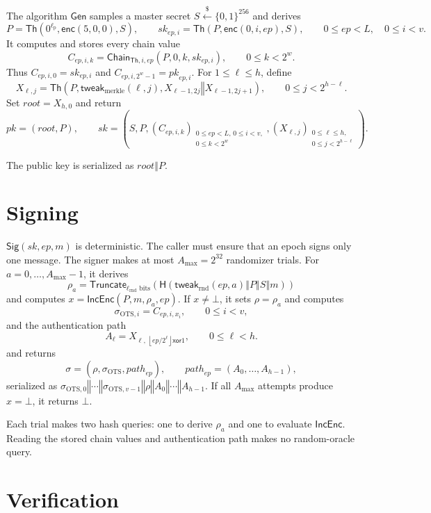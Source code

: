 \documentclass[11pt]{article}
\theoremstyle{definition}
\theoremstyle{plain}
\theoremstyle{remark}
\newcommand{\bits}[1]{\{0,1\}^{#1}}
\newcommand{\getsr}{\stackrel{\$}{\gets}}
\newcommand{\Th}{\mathsf{Th}}
\newcommand{\IncEnc}{\mathsf{IncEnc}}
\newcommand{\Gen}{\mathsf{Gen}}
\newcommand{\Sig}{\mathsf{Sig}}
\newcommand{\Chain}{\mathsf{Chain}}
\newcommand{\hash}{\mathsf{H}}
\newcommand{\Truncate}{\mathsf{Truncate}}
\newcommand{\concat}{\mathbin\Vert}
\newcommand{\ep}{\mathit{ep}}
\newcommand{\sk}{\mathit{sk}}
\newcommand{\pk}{\mathit{pk}}
\newcommand{\rootnode}{\mathit{root}}
\newcommand{\lpar}{\ell_{\mathrm{p}}}
\newcommand{\lrnd}{\ell_{\mathrm{rnd}}}
\newcommand{\amax}{A_{\max}}
\begin{document}
The algorithm $\Gen$ samples a master secret $S\getsr\bits{256}$ and derives
\[
  P=\Th\!\left(0^{\lpar},\mathsf{enc}(5,0,0),S\right),
  \qquad
  \mathit{sk}_{\ep,i}=\Th\!\left(P,\mathsf{enc}(0,i,\ep),S\right),
  \qquad 0\leq\ep<L,\quad 0\leq i<v.
\]
It computes and stores every chain value
\[
  C_{\ep,i,k}=\Chain_{\Th,i,\ep}(P,0,k,\mathit{sk}_{\ep,i}),
  \qquad 0\leq k<2^w.
\]
Thus $C_{\ep,i,0}=\mathit{sk}_{\ep,i}$ and $C_{\ep,i,2^w-1}=\mathit{pk}_{\ep,i}$. For $1\leq\ell\leq h$, define
\[
  X_{\ell,j}=\Th\!\left(P,\mathsf{tweak}_{\mathrm{merkle}}(\ell,j),X_{\ell-1,2j}\concat X_{\ell-1,2j+1}\right),
  \qquad 0\leq j<2^{h-\ell}.
\]
Set $\rootnode=X_{h,0}$ and return
\[
  \pk=(\rootnode,P),
  \qquad
  \sk=\left(S,P,(C_{\ep,i,k})_{\substack{0\leq\ep<L,\,0\leq i<v,\\0\leq k<2^w}},(X_{\ell,j})_{\substack{0\leq\ell\leq h,\\0\leq j<2^{h-\ell}}}\right).
\]

The public key is serialized as $\rootnode\concat P$.

\section{Signing}

$\Sig(\sk,\ep,m)$ is deterministic. The caller must ensure that an epoch signs only one message. The signer makes at most $\amax=2^{32}$ randomizer trials. For $a=0,\ldots,\amax-1$, it derives
\[
  \rho_a=\Truncate_{\lrnd\text{ bits}}\!\left(\hash(\mathsf{tweak}_{\mathrm{rnd}}(\ep,a)\concat P\concat S\concat m)\right)
\]
and computes $x=\IncEnc(P,m,\rho_a,\ep)$. If $x\neq\bot$, it sets $\rho=\rho_a$ and computes
\[
  \sigma_{\mathrm{OTS},i}=C_{\ep,i,x_i},
  \qquad 0\leq i<v,
\]
and the authentication path
\[
  A_\ell=X_{\ell,\,\left\lfloor\ep/2^\ell\right\rfloor\mathbin{\mathsf{xor}}1},
  \qquad 0\leq\ell<h.
\]
and returns
\[
  \sigma=(\rho,\sigma_{\mathrm{OTS}},\mathit{path}_{\ep}),
  \qquad
  \mathit{path}_{\ep}=(A_0,\ldots,A_{h-1}),
\]
serialized as $\sigma_{\mathrm{OTS},0}\concat\cdots\concat\sigma_{\mathrm{OTS},v-1}\concat\rho\concat A_0\concat\cdots\concat A_{h-1}$. If all $\amax$ attempts produce $x=\bot$, it returns $\bot$.

Each trial makes two hash queries: one to derive $\rho_a$ and one to evaluate $\IncEnc$. Reading the stored chain values and authentication path makes no random-oracle query.

\section{Verification}
\end{document}
